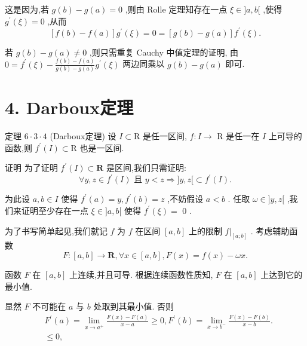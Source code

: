 这是因为,若 $g\left( b\right)  - g\left( a\right)  = 0$ ,则由 Rolle 定理知存在一点 $\xi  \in  \rbrack a,b\lbrack$ ,使得 ${g}^{\prime }\left( \xi \right)  = 0$ ,从而
$$\left\lbrack  {f\left( b\right)  - f\left( a\right) }\right\rbrack  {g}^{\prime }\left( \xi \right)  = 0 = \left\lbrack  {g\left( b\right)  - g\left( a\right) }\right\rbrack  {f}^{\prime }\left( \xi \right) .$$

若 $g\left( b\right)  - g\left( a\right)  \neq  0$ ,则只需重复 Cauchy 中值定理的证明, 由 $0 = {f}^{\prime }\left( \xi \right)  - \frac{f\left( b\right)  - f\left( a\right) }{g\left( b\right)  - g\left( a\right) }{g}^{\prime }\left( \xi \right)$ 两边同乘以 $g\left( b\right)  - g\left( a\right)$ 即可.

\section*{4. Darboux定理}

定理 $6 \cdot  3 \cdot  4$ (Darboux定理) 设 $I \subset  \mathrm{R}$ 是任一区间, $f : I \rightarrow$  $\mathrm{R}$ 是任一在 $I$ 上可导的函数,则 ${f}^{\prime }\left( I\right)  \subset  \mathrm{R}$ 也是一区间.

证明 为了证明 ${f}^{\prime }\left( I\right)  \subset  \mathbf{R}$ 是区间,我们只需证明:
$$\forall y,z \in  {f}^{\prime }\left( I\right) \text{ 且 }y < z \Rightarrow  \rbrack y,z\lbrack  \subset  {f}^{\prime }\left( I\right) .$$

为此设 $a,b \in  I$ 使得 ${f}^{\prime }\left( a\right)  = y,{f}^{\prime }\left( b\right)  = z$ ,不妨假设 $a < b$ . 任取 $\omega  \in  \rbrack y,z\lbrack$ ,我们来证明至少存在一点 $\xi  \in  \rbrack a,b\lbrack$ 使得 ${f}^{\prime }\left( \xi \right)  =$ 0 .

为了书写简单起见,我们就记 $f$ 为 $f$ 在区间 $\left\lbrack  {a,b}\right\rbrack$ 上的限制 $f{|}_{\left\lbrack  a;b\right\rbrack  }$ . 考虑辅助函数
$$F : \left\lbrack  {a,b}\right\rbrack   \rightarrow  \mathbf{R},\forall x \in  \left\lbrack  {a,b}\right\rbrack  ,F\left( x\right)  = f\left( x\right)  - {\omega x}.$$

函数 $F$ 在 $\left\lbrack  {a,b}\right\rbrack$ 上连续,并且可导. 根据连续函数性质知, $F$ 在 $\left\lbrack  {a,b}\right\rbrack$ 上达到它的最小值.

显然 $F$ 不可能在 $a$ 与 $b$ 处取到其最小值. 否则
\begin{align*}
	&{F}^{\prime }\left( a\right)  = \mathop{\lim }\limits_{{x \rightarrow  {a}^{ + }}}\frac{F\left( x\right)  - F\left( a\right) }{x - a} \geq  0,{F}^{\prime }\left( b\right)  = \mathop{\lim }\limits_{{x \rightarrow  {b}^{ - }}}\frac{F\left( x\right)  - F\left( b\right) }{x - b}.\\
	&\leq  0,
\end{align*}


